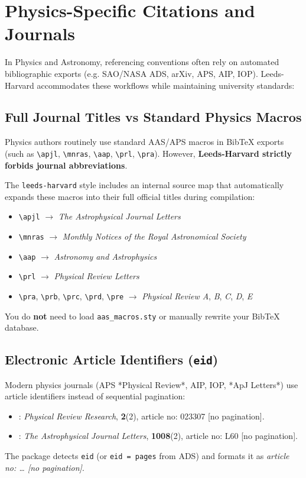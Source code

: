 \documentclass[a4paper,11pt]{article}
\begin{document}
\section{Physics-Specific Citations and Journals}

In Physics and Astronomy, referencing conventions often rely on automated bibliographic exports (e.g. SAO/NASA ADS, arXiv, APS, AIP, IOP). Leeds-Harvard accommodates these workflows while maintaining university standards:

\subsection{Full Journal Titles vs Standard Physics Macros}
Physics authors routinely use standard AAS/APS macros in BibTeX exports (such as \texttt{\textbackslash apjl}, \texttt{\textbackslash mnras}, \texttt{\textbackslash aap}, \texttt{\textbackslash prl}, \texttt{\textbackslash pra}). However, \textbf{Leeds-Harvard strictly forbids journal abbreviations}.

The \texttt{leeds-harvard} style includes an internal source map that automatically expands these macros into their full official titles during compilation:
\begin{itemize}
  \item \texttt{\textbackslash apjl} $\to$ \emph{The Astrophysical Journal Letters}
  \item \texttt{\textbackslash mnras} $\to$ \emph{Monthly Notices of the Royal Astronomical Society}
  \item \texttt{\textbackslash aap} $\to$ \emph{Astronomy and Astrophysics}
  \item \texttt{\textbackslash prl} $\to$ \emph{Physical Review Letters}
  \item \texttt{\textbackslash pra}, \texttt{\textbackslash prb}, \texttt{\textbackslash prc}, \texttt{\textbackslash prd}, \texttt{\textbackslash pre} $\to$ \emph{Physical Review A}, \emph{B}, \emph{C}, \emph{D}, \emph{E}
\end{itemize}
You do \textbf{not} need to load \texttt{aas\_macros.sty} or manually rewrite your BibTeX database.

\subsection{Electronic Article Identifiers (\texttt{eid})}
Modern physics journals (APS *Physical Review*, AIP, IOP, *ApJ Letters*) use article identifiers instead of sequential pagination:
\begin{itemize}
  \item \parencite{kurikawa2020}: \emph{Physical Review Research}, \textbf{2}(2), article no: 023307 [no pagination].
  \item \parencite{2026ApJ..1008L..60C}: \emph{The Astrophysical Journal Letters}, \textbf{1008}(2), article no: L60 [no pagination].
\end{itemize}
The package detects \texttt{eid} (or \texttt{eid = pages} from ADS) and formats it as \emph{article no: \dots{} [no pagination]}.
\end{document}

